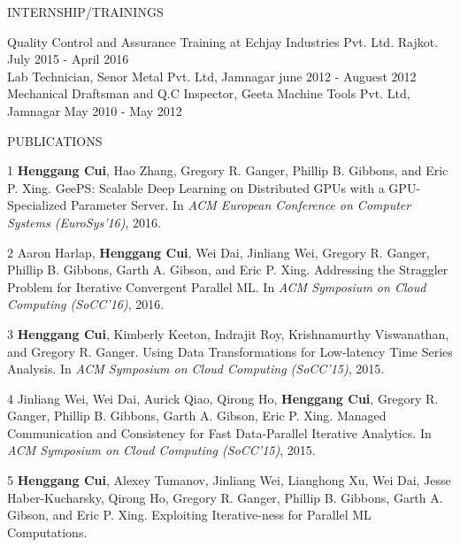\documentclass{resume} %
\begin{document}

\begin{rSection}{INTERNSHIP/TRAININGS} \itemsep -3pt  

{Quality Control and Assurance Training at Echjay Industries Pvt. Ltd. Rajkot.} \hfill July 2015 - April 2016 \\ 
{Lab Technician, Senor Metal Pvt. Ltd, Jamnagar} \hfill june 2012 - Auguest 2012\\
{Mechanical Draftsman and Q.C Inspector, Geeta Machine Tools Pvt. Ltd, Jamnagar} \hfill May 2010 - May 2012 \\
\end{rSection} 

\begin{rSection}{PUBLICATIONS}
    \item
    [1]
        {\bf Henggang Cui}, Hao Zhang, Gregory R. Ganger, Phillip B. Gibbons, and Eric P. Xing.
        GeePS: Scalable Deep Learning on Distributed GPUs with a GPU-Specialized Parameter Server.
        In \emph{ACM European Conference on Computer Systems (EuroSys'16)},
        2016.
    \item
    [2]
        Aaron Harlap, {\bf Henggang Cui}, Wei Dai, Jinliang Wei,
        Gregory R. Ganger, Phillip B. Gibbons, Garth A. Gibson, and Eric P. Xing.
        Addressing the Straggler Problem for Iterative Convergent Parallel ML.
        In \emph{ACM Symposium on Cloud Computing (SoCC'16)},
        2016.
    \item
    [3]
        {\bf Henggang Cui}, Kimberly Keeton, Indrajit Roy, Krishnamurthy Viswanathan, and Gregory R. Ganger.
        Using Data Transformations for Low-latency Time Series Analysis.
        In \emph{ACM Symposium on Cloud Computing (SoCC'15)},
        2015.
    \item
    [4]
        Jinliang Wei, Wei Dai, Aurick Qiao, Qirong Ho, {\bf Henggang Cui},
        Gregory R. Ganger, Phillip B. Gibbons, Garth A. Gibson, Eric P. Xing.
        Managed Communication and Consistency for Fast Data-Parallel Iterative Analytics.
        In \emph{ACM Symposium on Cloud Computing (SoCC'15)},
        2015.
    \item
    [5]
        {\bf Henggang Cui}, Alexey Tumanov, Jinliang Wei, Lianghong Xu, Wei Dai,
        Jesse Haber-Kucharsky, Qirong Ho, Gregory R. Ganger, Phillip B. Gibbons, Garth A. Gibson, and Eric P. Xing.
        Exploiting Iterative-ness for Parallel ML Computations.

\end{rSection}
\end{document}
